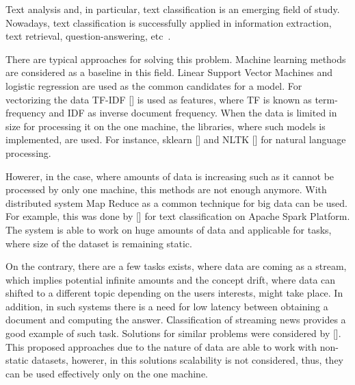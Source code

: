 \label {fs-short-intro}



Text analysis and, in particular, text classification is an emerging field of study. Nowadays, text classification is successfully applied in information extraction, text retrieval, question-answering, etc~\cite{tampakas2005}.

There are typical approaches for solving this problem. Machine learning methods are considered as a baseline in this field. Linear Support Vector Machines and logistic regression are used as the common candidates for a model. For vectorizing the data TF-IDF [] is used as features, where TF is known as term-frequency and IDF as inverse document frequency. When the data is limited in size for processing it on the one machine, the libraries, where such models is implemented, are used. For instance, sklearn [] and NLTK [] for natural language processing.

Howerer, in the case, where amounts of data is increasing such as it cannot be processed by only one machine, this methods are not enough anymore. With distributed system Map Reduce as a common technique for big data can be used. For example, this was done by [] for text classification on Apache Spark Platform. The system is able to work on huge amounts of data and applicable for tasks, where size of the dataset is remaining static.

On the contrary, there are a few tasks exists, where data are coming as a stream, which implies potential infinite amounts and the concept drift, where data can shifted to a different topic depending on the users interests, might take place. In addition, in such systems there is a need for low latency between obtaining a document and computing the answer. Сlassification of streaming news provides a good example of such task. Solutions for similar problems were considered by []. This proposed approaches due to the nature of data are able to work with non-static datasets, howerer, in this solutions scalability is not considered, thus, they can be used effectively only on the one machine.

